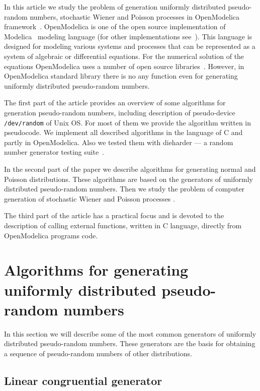 \documentclass[%
floatfix,
showkeys,
nofootinbib, %
superscriptaddress, %
]{revtex4-1}
\begin{document}
In this article we study the problem of generation uniformly
distributed pseudo-random numbers, stochastic Wiener and Poisson
processes in OpenModelica
framework~\cite{L_OpenModelica}. OpenModelica is one of the open
source implementation of Modelica~\cite{L_Modelica} modeling language
(for other implementations see~\cite{L_SciLab, L_LMS, L_Dymola,
  L_JModelica, L_WolframSystemModeler, L_MapleSim}). This language is
designed for modeling various systems and processes that can be
represented as a system of algebraic or differential equations. For
the numerical solution of the equations OpenModelica uses a number of
open source libraries~\cite{L_lis:2016, L_LAPACK:2016, L_UMFPACK:2016,
  L_KINSOL:2015}. However, in OpenModelica standard library there is
no any function even for generating uniformly distributed
pseudo-random numbers.

The first part of the article provides an overview of some algorithms
for generation pseudo-random numbers, including description of
pseudo-device \texttt{/dev/random} of Unix OS. For most of them we
provide the algorithm written in pseudocode. We implement all
described algorithms in the language of C and partly in
OpenModelica. Also we tested them with dieharder --- a random number
generator testing suite~\cite{L_DieHarder:2013}.

In the second part of the paper we describe algorithms for generating
normal and Poisson distributions. These algorithms are based on the
generators of uniformly distributed pseudo-random numbers. Then we
study the problem of computer generation of stochastic Wiener and
Poisson processes .

The third part of the article has a practical focus and is devoted to
the description of calling external functions, written in C language,
directly from OpenModelica programs code.



\section{Algorithms for generating uniformly distributed pseudo-random numbers}

In this section we will describe some of the most common generators of
uniformly distributed pseudo-random numbers. These generators are the
basis for obtaining a sequence of pseudo-random numbers of other
distributions.

\subsection{Linear congruential generator}
\end{document}
